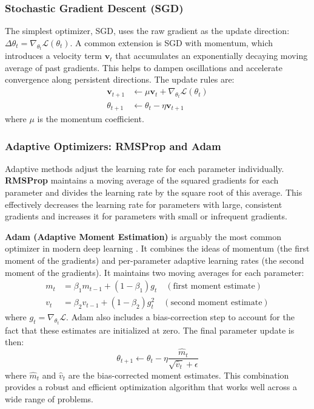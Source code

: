 \documentclass[a4paper]{article}
\begin{document}
\subsubsection{Stochastic Gradient Descent (SGD)}
The simplest optimizer, SGD, uses the raw gradient as the update direction: $\Delta \theta_t = \nabla_{\theta_t} \mathcal{L}(\theta_t)$. A common extension is SGD with momentum, which introduces a velocity term $\mathbf{v}_t$ that accumulates an exponentially decaying moving average of past gradients. This helps to dampen oscillations and accelerate convergence along persistent directions. The update rules are:
\begin{align*}
    \mathbf{v}_{t+1} &\leftarrow \mu \mathbf{v}_t + \nabla_{\theta_t} \mathcal{L}(\theta_t) \\
    \theta_{t+1} &\leftarrow \theta_t - \eta \mathbf{v}_{t+1}
\end{align*}
where $\mu$ is the momentum coefficient.

\subsubsection{Adaptive Optimizers: RMSProp and Adam}
Adaptive methods adjust the learning rate for each parameter individually. \textbf{RMSProp} \cite{hinton2012neural} maintains a moving average of the squared gradients for each parameter and divides the learning rate by the square root of this average. This effectively decreases the learning rate for parameters with large, consistent gradients and increases it for parameters with small or infrequent gradients.

\textbf{Adam (Adaptive Moment Estimation)} is arguably the most common optimizer in modern deep learning \cite{kingma2014adam}. It combines the ideas of momentum (the first moment of the gradients) and per-parameter adaptive learning rates (the second moment of the gradients). It maintains two moving averages for each parameter:
\begin{align*}
    m_t &= \beta_1 m_{t-1} + (1 - \beta_1) g_t \quad (\text{first moment estimate}) \\
    v_t &= \beta_2 v_{t-1} + (1 - \beta_2) g_t^2 \quad (\text{second moment estimate})
\end{align*}
where $g_t = \nabla_{\theta_t} \mathcal{L}$. Adam also includes a bias-correction step to account for the fact that these estimates are initialized at zero. The final parameter update is then:
\begin{equation}
    \theta_{t+1} \leftarrow \theta_t - \eta \frac{\hat{m}_t}{\sqrt{\hat{v}_t} + \epsilon}
\end{equation}
where $\hat{m}_t$ and $\hat{v}_t$ are the bias-corrected moment estimates. This combination provides a robust and efficient optimization algorithm that works well across a wide range of problems.
\end{document}
